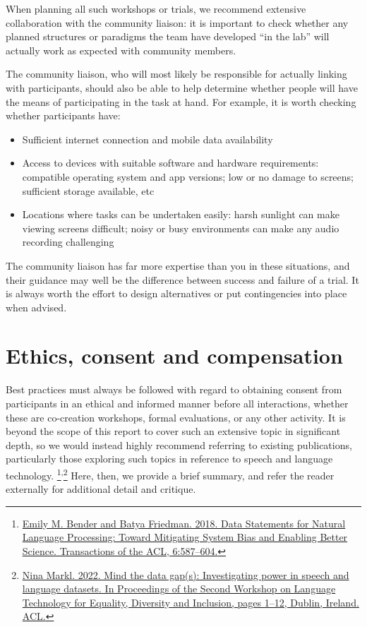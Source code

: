 \documentclass[10pt,twoside,openright]{report}
\begin{document}
When planning all such workshops or trials, we recommend extensive collaboration with the community liaison: it is important to check whether any planned structures or paradigms the team have developed ``in the lab'' will actually work as expected with community members. 

The community liaison, who will most likely be responsible for actually linking with participants, should also be able to help determine whether people will have the means of participating in the task at hand.
For example, it is worth checking whether participants have:
\begin{itemize}
    \item Sufficient internet connection and mobile data availability
    \item Access to devices with suitable software and hardware requirements: compatible operating system and app versions; low or no damage to screens; sufficient storage available, etc
    \item Locations where tasks can be undertaken easily: harsh sunlight can make viewing screens difficult; noisy or busy environments can make any audio recording challenging
\end{itemize}

The community liaison has far more expertise than you in these situations, and their guidance may well be the difference between success and failure of a trial.
It is always worth the effort to design alternatives or put contingencies into place when advised.


\section{Ethics, consent and compensation}
Best practices must always be followed with regard to obtaining consent from participants in an ethical and informed manner before all interactions, whether these are co-creation workshops, formal evaluations, or any other activity.
It is beyond the scope of this report to cover such an extensive topic in significant depth, so we would instead highly recommend referring to existing publications, particularly those exploring such topics in reference to speech and language technology.
\footnote{\href{https://doi.org/10.1162/tacl_a_00041}{Emily M. Bender and Batya Friedman. 2018. Data Statements for Natural Language Processing: Toward Mitigating System Bias and Enabling Better Science. Transactions of the ACL, 6:587–604.}}\textsuperscript{,}\footnote{\href{https://doi.org/10.18653/v1/2022.ltedi-1.1}{Nina Markl. 2022. Mind the data gap(s): Investigating power in speech and language datasets. In Proceedings of the Second Workshop on Language Technology for Equality, Diversity and Inclusion, pages 1–12, Dublin, Ireland. ACL.}}
Here, then, we provide a brief summary, and refer the reader externally for additional detail and critique.
\end{document}
